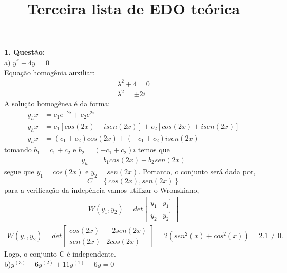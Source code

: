 \documentclass[a4paper,12pt]{article}
\title{ Terceira lista de EDO te\'orica}
\date{\vspace{-5ex}}
\begin{document}
\maketitle\thispagestyle{fancy}
\textbf{1. Quest\~ao:}\\
a) $y^{''} + 4y$ = 0\\
Equa\c c\~ao homog\^enia auxiliar:
\begin{align*}
	{\lambda}^{2} + 4 = 0 \\
	{\lambda}^{2} = \pm 2i
\end{align*}
A solu\c c\~ao homog\^enea \'e da forma:
\begin{align*}
	y_{h}{x} &= c_1e^{-2i} + c_2 e^{2i}\\
	y_{h}{x} &=  c_1 \left [ cos(2x) -isen(2x)\right ] +  c_2 \left [ cos(2x) +isen(2x)\right ]\\
	y_h{x} &= (c_1 + c_2)cos(2x) + (-c_1 + c_2)isen(2x)
\end{align*}
tomando $b_1 = c_1 + c_2$ e $b_2 = (-c_1 + c_2)i$ temos que
\begin{align*}
	y_{h} &= b_1 cos(2x) + b_2 sen(2x)
\end{align*}
segue que $y_1 = cos(2x)$ e $y_2 = sen(2x)$. Portanto, o conjunto ser\'a dada por,
$$C =\left \{ cos(2x), sen(2x) \right \}$$
para a verifica\c c\~ao da indep\^encia vamos utilizar o Wronskiano, 
\begin{align*}
	W(y_1,y_2) = det \left [ \begin{array}{cc} 
			y_1 & {y_1}^{'} \\
			y_2 & {y_2}^{'}
	\end{array} \right ] 
\end{align*}
\begin{align*}
	W(y_1,y_2) = det \left [ \begin{array}{cc} 
			cos(2x) & -2sen(2x) \\
			sen(2x) & 2cos(2x)
	\end{array} \right ] = 2({sen}^{2}(x) + {cos}^{2}(x)) = 2.1 \neq 0.
\end{align*}
Logo, o conjunto C \'e independente. \\

b)$y^{(3)} -6y^{(2)} + 11y^{(1)} - 6y = 0$\\
\end{document}
